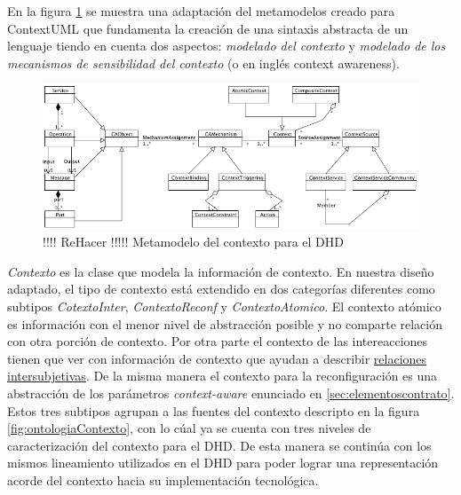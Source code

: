 En la figura \ref{fig:contextMetamodel} se muestra una adaptación del
metamodelos creado para ContextUML \cite{contextUML} que fundamenta la
creación de una sintaxis abstracta de un lenguaje tiendo en cuenta dos
aspectos:
\textit{modelado del contexto} y \textit{modelado de los mecanismos
de sensibilidad del contexto} (o en inglés context awareness).


\begin{figure} 
\begin{center}
 \includegraphics [width=5 in,totalheight=3 in]
{Ch1/Figuras/contextMetamodel}
\caption {!!!! ReHacer !!!!! Metamodelo del contexto para el DHD }
\label{fig:contextMetamodel}
\end{center}
\end{figure}



\textit{Contexto} es la clase que modela la información de contexto. En nuestra
diseño adaptado, el tipo de contexto está extendido en dos categorías
diferentes como subtipos \textit{CotextoInter}, \textit{ContextoReconf} y
\textit{ContextoAtomico}. El contexto atómico es información con el menor
nivel de abstracción posible y no comparte relación con otra porción de
contexto. Por otra parte el contexto de las intereacciones tienen que ver con
información de contexto que ayudan a describir 
\hyperref[intersubjetivas]{relaciones intersubjetivas}. De la misma manera el
contexto para la reconfiguración es una abstracción de los parámetros
\textit{context-aware} enunciado en \ref{sec:elementoscontrato}. Estos tres
subtipos agrupan a las fuentes del contexto descripto en la figura
\ref{fig:ontologiaContexto}, con lo cúal ya se cuenta con tres niveles de
caracterización del contexto para el DHD. De esta manera se continúa con los
mismos lineamiento utilizados en el DHD para poder lograr una representación
acorde del contexto hacia su implementación tecnológica. 


